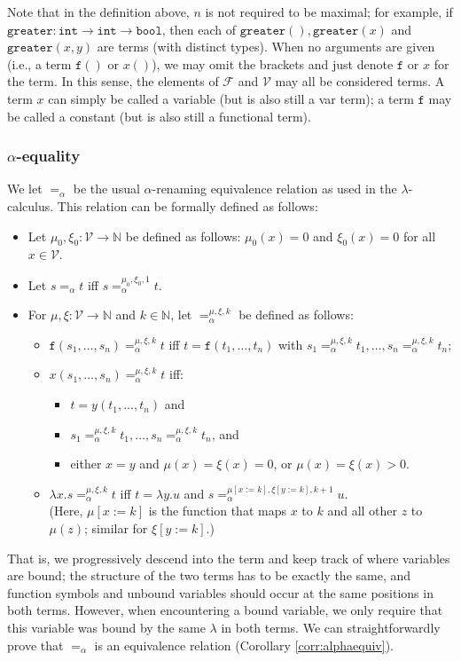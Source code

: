 \documentclass{lmcs}
\theoremstyle{theorem}\newtheorem{theorem}[dummy]{Theorem}
\theoremstyle{theorem}\newtheorem{lemma}[dummy]{Lemma}
\theoremstyle{theorem}\newtheorem{corollary}[dummy]{Corollary}
\theoremstyle{definition}\newtheorem{definition}[dummy]{Definition}
\theoremstyle{definition}\newtheorem{example}[dummy]{Example}
\newcommand{\N}{\mathbb{N}}
\newcommand{\F}{\mathcal{F}}
\newcommand{\V}{\mathcal{V}}
\newcommand{\identifier}[1]{\mathtt{#1}}
\newcommand{\afun}{\identifier{f}}
\newcommand{\avar}{x}
\newcommand{\bvar}{y}
\newcommand{\cvar}{z}
\newcommand{\abs}[2]{\lambda #1.#2}
\newcommand{\arrtype}{\rightarrow}
\newcommand{\symb}[1]{\mathtt{#1}}
\newcommand{\mysubsection}[1]{\vspace{-12pt}\subsubsection{#1}}
\begin{document}
Note that in the definition above, $n$ is not required to be maximal; for example, if
$\symb{greater} : \mathtt{int} \arrtype \mathtt{int} \arrtype \mathtt{bool}$, then each of
$\symb{greater}(),\symb{greater}(\avar)$ and $\symb{greater}(\avar,\bvar)$ are terms (with
distinct types). When no arguments are given (i.e., a term $\afun()$ or $\avar()$), we may omit
the brackets and just denote $\afun$ or $\avar$ for the term.  In this sense, the elements of $\F$
and $\V$ may all be considered terms.
A term $\avar$ can simply be called a variable (but is also still a var term);
a term $\afun$ may be called a constant (but is also still a functional term).

\mysubsection{$\alpha$-equality}
We let $=_\alpha$ be the usual $\alpha$-renaming equivalence relation as used in the
$\lambda$-calculus. This relation can be formally defined as follows:
\begin{itemize}
\item Let $\mu_0,\xi_0 : \V \rightarrow \N$ be defined as follows:
  $\mu_0(\avar) = 0$ and $\xi_0(\avar) = 0$ for all $\avar \in \V$.
\item Let $s =_\alpha t$ iff $s =_\alpha^{\mu_0,\xi_0,1} t$.
\item For $\mu,\xi : \V \rightarrow \N$ and $k \in \N$, let $=_\alpha^{\mu,\xi,k}$ be defined as
  follows:
  \begin{itemize}
  \item $\afun(s_1,\dots,s_n) =_\alpha^{\mu,\xi,k} t$ iff $t = \afun(t_1,\dots,t_n)$ with $s_1
    =_\alpha^{\mu,\xi,k} t_1,\dots,s_n =_\alpha^{\mu,\xi,k} t_n$;
  \item $\avar(s_1,\dots,s_n) =_\alpha^{\mu,\xi,k} t$ iff:
    \begin{itemize}
    \item $t = \bvar(t_1,\dots,t_n)$ and
    \item $s_1 =_\alpha^{\mu,\xi,k} t_1,\dots,s_n =_\alpha^{\mu,\xi,k} t_n$, and
    \item either $\avar = \bvar$ and $\mu(\avar) = \xi(\avar) = 0$,
      or $\mu(\avar) = \xi(\avar) > 0$.
    \end{itemize}
  \item $\abs{\avar}{s} =_\alpha^{\mu,\xi,k} t$ iff
    $t = \abs{\bvar}{u}$ and $s =_\alpha^{\mu[\avar:=k],\xi[\bvar:=k],k+1} u$. \\
    (Here, $\mu[\avar:=k]$ is the function that maps $\avar$ to $k$ and all other $\cvar$ to
    $\mu(\cvar)$; similar for $\xi[\bvar:=k]$.)
  \end{itemize}
\end{itemize}
That is, we progressively descend into the term and keep track of where variables are bound; the
structure of the two terms has to be exactly the same, and function symbols and unbound variables
should occur at the same positions in both terms. However, when encountering a bound variable, we
only require that this variable was bound by the same $\lambda$ in both terms.
We can straightforwardly prove that $=_\alpha$ is an equivalence relation (Corollary
\ref{corr:alphaequiv}).
\end{document}

